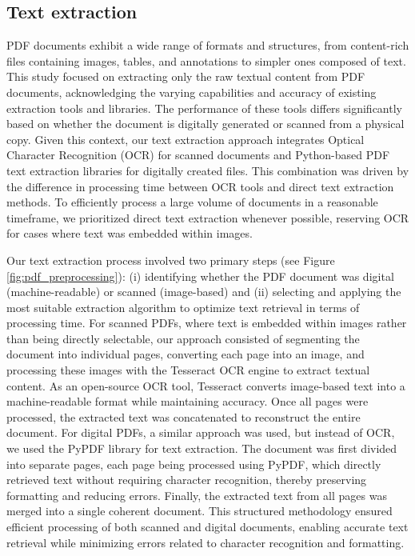 \documentclass{article}
\begin{document}
\subsection{Text extraction}
\par 
PDF documents exhibit a wide range of formats and structures, from content-rich files containing images, tables, and annotations to simpler ones composed of text. 
This study focused on extracting only the raw textual content from PDF documents, acknowledging the varying capabilities and accuracy of existing extraction tools and libraries. 
The performance of these tools differs significantly based on whether the document is digitally generated or scanned from a physical copy. 
Given this context, our text extraction approach integrates Optical Character Recognition (OCR) for scanned documents and Python-based PDF text extraction libraries \citep{2024.PY.P5D} for digitally created files. 
This combination was driven by the difference in processing time between OCR tools and direct text extraction methods. 
To efficiently process a large volume of documents in a reasonable timeframe, we prioritized direct text extraction whenever possible, reserving OCR for cases where text was embedded within images.
\par 
Our text extraction process involved two primary steps (see Figure \ref{fig:pdf_preprocessing}): (i) identifying whether the PDF document was digital (machine-readable) or scanned (image-based) and (ii) selecting and applying the most suitable extraction algorithm to optimize text retrieval in terms of processing time. 
For scanned PDFs, where text is embedded within images rather than being directly selectable, our approach consisted of segmenting the document into individual pages, converting each page into an image, and processing these images with the Tesseract OCR engine \citep{2007.RA.AOO} to extract textual content. 
As an open-source OCR tool, Tesseract converts image-based text into a machine-readable format while maintaining accuracy. 
Once all pages were processed, the extracted text was concatenated to reconstruct the entire document. 
For digital PDFs, a similar approach was used, but instead of OCR, we used the PyPDF library for text extraction. 
The document was first divided into separate pages, each page being processed using PyPDF, which directly retrieved text without requiring character recognition, thereby preserving formatting and reducing errors. 
Finally, the extracted text from all pages was merged into a single coherent document. 
This structured methodology ensured efficient processing of both scanned and digital documents, enabling accurate text retrieval while minimizing errors related to character recognition and formatting.
\end{document}
